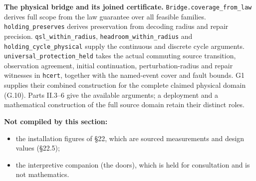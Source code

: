 \documentclass[
]{article}
\providecommand{\tightlist}{%
  \setlength{\itemsep}{0pt}\setlength{\parskip}{0pt}}
\begin{document}
\textbf{The physical bridge and its joined certificate.}
\texttt{B\allowbreak{}r\allowbreak{}i\allowbreak{}d\allowbreak{}g\allowbreak{}e\allowbreak{}.\allowbreak{}c\allowbreak{}o\allowbreak{}v\allowbreak{}e\allowbreak{}r\allowbreak{}a\allowbreak{}g\allowbreak{}e\allowbreak{}\_\allowbreak{}f\allowbreak{}r\allowbreak{}o\allowbreak{}m\allowbreak{}\_\allowbreak{}l\allowbreak{}a\allowbreak{}w}
derives full scope from the law guarantee over all feasible families.
\texttt{h\allowbreak{}o\allowbreak{}l\allowbreak{}d\allowbreak{}i\allowbreak{}n\allowbreak{}g\allowbreak{}\_\allowbreak{}p\allowbreak{}r\allowbreak{}e\allowbreak{}s\allowbreak{}e\allowbreak{}r\allowbreak{}v\allowbreak{}e\allowbreak{}s}
derives preservation from decoding radius and repair precision.
\texttt{q\allowbreak{}s\allowbreak{}l\allowbreak{}\_\allowbreak{}w\allowbreak{}i\allowbreak{}t\allowbreak{}h\allowbreak{}i\allowbreak{}n\allowbreak{}\_\allowbreak{}r\allowbreak{}a\allowbreak{}d\allowbreak{}i\allowbreak{}u\allowbreak{}s},
\texttt{h\allowbreak{}e\allowbreak{}a\allowbreak{}d\allowbreak{}r\allowbreak{}o\allowbreak{}o\allowbreak{}m\allowbreak{}\_\allowbreak{}w\allowbreak{}i\allowbreak{}t\allowbreak{}h\allowbreak{}i\allowbreak{}n\allowbreak{}\_\allowbreak{}r\allowbreak{}a\allowbreak{}d\allowbreak{}i\allowbreak{}u\allowbreak{}s}
and
\texttt{h\allowbreak{}o\allowbreak{}l\allowbreak{}d\allowbreak{}i\allowbreak{}n\allowbreak{}g\allowbreak{}\_\allowbreak{}c\allowbreak{}y\allowbreak{}c\allowbreak{}l\allowbreak{}e\allowbreak{}\_\allowbreak{}p\allowbreak{}h\allowbreak{}y\allowbreak{}s\allowbreak{}i\allowbreak{}c\allowbreak{}a\allowbreak{}l}
supply the continuous and discrete cycle arguments.
\texttt{u\allowbreak{}n\allowbreak{}i\allowbreak{}v\allowbreak{}e\allowbreak{}r\allowbreak{}s\allowbreak{}a\allowbreak{}l\allowbreak{}\_\allowbreak{}p\allowbreak{}r\allowbreak{}o\allowbreak{}t\allowbreak{}e\allowbreak{}c\allowbreak{}t\allowbreak{}i\allowbreak{}o\allowbreak{}n\allowbreak{}\_\allowbreak{}h\allowbreak{}e\allowbreak{}l\allowbreak{}d}
takes the actual commuting source transition, observation agreement,
initial continuation, perturbation-radius and repair witnesses in
\texttt{hcert}, together with the named-event cover and fault bounds. G1
supplies their combined construction for the complete claimed physical
domain (G.10). Parts II.3--6 give the available arguments; a deployment
and a mathematical construction of the full source domain retain their
distinct roles.

\textbf{Not compiled by this section:}

\begin{itemize}
\tightlist
\item
  the installation figures of §22, which are sourced measurements and
  design values (§22.5);
\item
  the interpretive companion (the doors), which is held for consultation
  and is not mathematics.
\end{itemize}
\end{document}
